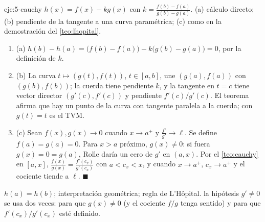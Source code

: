 \begin{solucion}{eje:5-cauchy}
\datos $h(x)=f(x)-kg(x)$ con $k=\frac{f(b)-f(a)}{g(b)-g(a)}$.
\planteamiento (a) cálculo directo; (b) pendiente de la tangente a una curva paramétrica; (c) como en la demostración del \cref{teo:lhopital}.
\pasos
\begin{enumerate}[label=\arabic*.]
  \item (a) $h(b)-h(a)=\bigl(f(b)-f(a)\bigr)-k\bigl(g(b)-g(a)\bigr)=0$, por la definición de $k$.
  \item (b) La curva $t\mapsto(g(t),f(t))$, $t\in[a,b]$, une $(g(a),f(a))$ con $(g(b),f(b))$; la cuerda tiene pendiente $k$, y la tangente en $t=c$ tiene vector director $(g'(c),f'(c))$ y pendiente $f'(c)/g'(c)$. El teorema afirma que hay un punto de la curva con tangente paralela a la cuerda; con $g(t)=t$ es el TVM.
  \item (c) Sean $f(x),g(x)\to0$ cuando $x\to a^{+}$ y $\frac{f'}{g'}\to\ell$. Se define $f(a)=g(a)=0$. Para $x>a$ próximo, $g(x)\ne0$: si fuera $g(x)=0=g(a)$, Rolle daría un cero de $g'$ en $(a,x)$. Por el \cref{teo:cauchy} en $[a,x]$, $\frac{f(x)}{g(x)}=\frac{f'(c_x)}{g'(c_x)}$ con $a<c_x<x$, y cuando $x\to a^{+}$, $c_x\to a^{+}$ y el cociente tiende a $\ell$. \hfill$\blacksquare$
\end{enumerate}
\resultado $h(a)=h(b)$; interpretación geométrica; regla de L'Hôpital.
\comprobacion la hipótesis $g'\ne0$ se usa dos veces: para que $g(x)\ne0$ (y el cociente $f/g$ tenga sentido) y para que $f'(c_x)/g'(c_x)$ esté definido.
\end{solucion}

